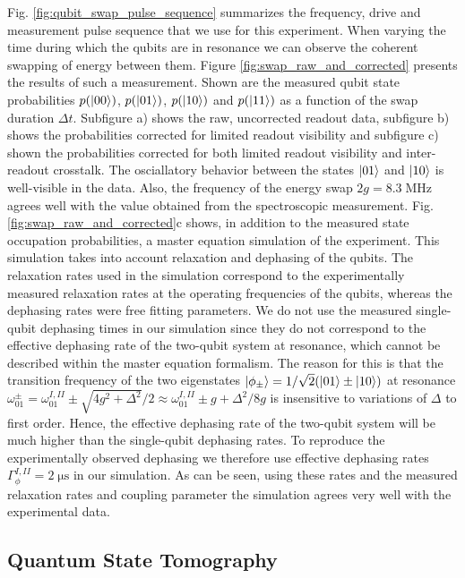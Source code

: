 Fig. \ref{fig:qubit_swap_pulse_sequence} summarizes the frequency, drive and measurement pulse sequence that we use for this experiment. When varying the time during which the qubits are in resonance we can observe the coherent swapping of energy between them. Figure \ref{fig:swap_raw_and_corrected} presents the results of such a measurement. Shown are the measured qubit state probabilities $p(\left| 00 \right>)$, $p(\left| 01 \right>)$, $p(\left| 10 \right>)$ and $p(\left| 11 \right>)$ as a function of the swap duration $\Delta t$. Subfigure a) shows the raw, uncorrected readout data, subfigure b) shows the probabilities corrected for limited readout visibility and subfigure c) shown the probabilities corrected for both limited readout visibility and inter-readout crosstalk. The osciallatory behavior between the states $\left| 01 \right>$ and $\left| 10 \right>$ is well-visible in the data. Also, the frequency of the energy swap $2g=8.3\;\mathrm{MHz}$ agrees well with the value obtained from the spectroscopic measurement. Fig. \ref{fig:swap_raw_and_corrected}c shows, in addition to the measured state occupation probabilities, a master equation simulation of the experiment. This simulation takes into account relaxation and dephasing of the qubits. The relaxation rates used in the simulation correspond to the experimentally measured relaxation rates at the operating frequencies of the qubits, whereas the dephasing rates were free fitting parameters. We do not use the measured single-qubit dephasing times in our simulation since they do not correspond to the effective dephasing rate of the two-qubit system at resonance, which cannot be described within the master equation formalism. The reason for this is that the transition frequency of the two eigenstates $\left| \phi_\pm \right>=1/\sqrt{2}(\left| 01 \right>\pm\left| 10 \right>)$ at resonance $\omega_{01}^{\pm}=\omega_{01}^{I,II}\pm\sqrt{4g^2+\Delta^2}/2\approx \omega_{01}^{I,II}\pm g +\Delta^2/8g$ is insensitive to variations of $\Delta$ to first order. Hence, the effective dephasing rate of the two-qubit system will be much higher than the single-qubit dephasing rates. To reproduce the experimentally observed dephasing we therefore use effective dephasing rates $\Gamma_\phi^{I,II}=2\;\mathrm{\mu s}$ in our simulation. As can be seen, using these rates and the measured relaxation rates and coupling parameter the simulation agrees very well with the experimental data.

\subsection{Quantum State Tomography}

